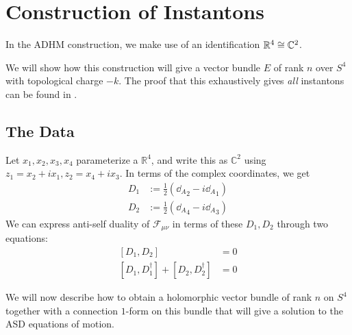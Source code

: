 

\section{Construction of Instantons} %
\label{sec:construction_of_instantons}
	
	In the ADHM construction, we make use of an identification $\mathbb{R}^4 \cong \mathbb{C}^2$. 
	
	We will show how this construction will give a vector bundle $E$ of rank $n$ over $S^4$ with topological charge $-k$. The proof that this exhaustively gives \emph{all} instantons can be found in \cite{donaldson1988}.
	
	
	\subsection{The Data}
	
	Let $x_1, x_2, x_3, x_4$ parameterize a $\mathbb R^4$, and write this as $\mathbb C^2$ using $z_1 = x_2 + i x_1, z_2 = x_4 + i x_3$. In terms of the complex coordinates, we get
	\begin{equation}
		\begin{aligned}
			D_1 &:= \frac{1}{2} ({\dd_A}_2 - i {\dd_A}_1)\\
			D_2 &:= \frac{1}{2} ({\dd_A}_4 - i {\dd_A}_3)
		\end{aligned}
	\end{equation}
	We can express anti-self duality of $\mathcal F_{\mu \nu}$ in terms of these $D_1, D_2$ through two equations:
	\begin{equation}
		\begin{aligned}
			\left[ D_1, D_2 \right] &= 0\\
			[D_1, D_1^\dagger] + [D_2, D_2^\dagger] &= 0
		\end{aligned}
	\end{equation}
	
	We will now describe how to obtain a holomorphic vector bundle of rank $n$ on $S^4$ together with a connection $1$-form on this bundle that will give a solution to the ASD equations of motion. 
	
